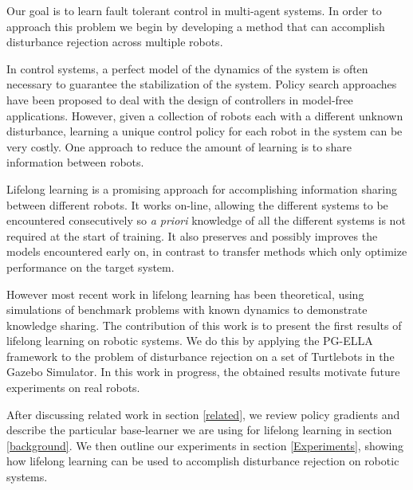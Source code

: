 \documentclass{aamas2016}
\begin{document}
%


Our goal is to learn fault tolerant control in multi-agent systems. In order to approach this problem we begin by developing a method that can accomplish disturbance rejection across multiple robots. 

In control systems, a perfect model of the dynamics of the system is often necessary to guarantee the stabilization of the system. Policy search approaches have been proposed to deal with the design of controllers in model-free applications. However, given a collection of robots each with a different unknown disturbance, learning a unique control policy for each robot in the system can be very costly. One approach to reduce the amount of learning is to share information between robots. 

Lifelong learning \cite{Ruvolo2013} is a promising approach for accomplishing information sharing between different robots. It works on-line, allowing the different systems to be encountered consecutively so \textit{a priori} knowledge of all the different systems is not required at the start of training. It also preserves and possibly improves the models encountered early on, in contrast to transfer methods which only optimize performance on the target system.

However most recent work in lifelong learning \cite{Ruvolo2013,BouAmmar2014a,bouAmmar2015unsupervised} has been theoretical, using simulations of benchmark problems with known dynamics to demonstrate knowledge sharing. The contribution of this work is to present the first results of lifelong learning on robotic systems. We do this by applying the PG-ELLA framework \cite{BouAmmar2014a} to the problem of disturbance rejection on a set of Turtlebots in the Gazebo Simulator. In this work in progress, the obtained results motivate future experiments on real robots. 

After discussing related work in section \ref{related}, we review policy gradients and describe the particular base-learner we are using for lifelong learning in  section \ref{background}. We then outline our experiments in section \ref{Experiments}, showing how lifelong learning can be used to accomplish disturbance rejection on robotic systems.
\end{document}
